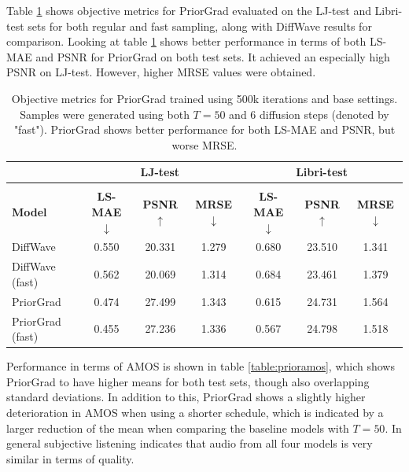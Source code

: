 \documentclass{report}
\begin{document}
Table \ref{table:priorstats} shows objective metrics for PriorGrad evaluated on the LJ-test and Libri-test sets for both regular and fast sampling, along with DiffWave results for comparison. Looking at table \ref{table:priorstats} shows better performance in terms of both LS-MAE and PSNR for PriorGrad on both test sets. It achieved an especially high PSNR on LJ-test. However, higher MRSE values were obtained. 

\begin{table}[H]
\centering
\def\arraystretch{1.3}
\begin{tabular}{l | c c c | c c c }
\hline
 & \multicolumn{3}{c|}{\textbf{LJ-test}} & \multicolumn{3}{c}{\textbf{Libri-test}} \\
\hline\hline
\vspace{-0.5cm} \\
\textbf{Model} & \textbf{LS-MAE} $\downarrow$ & \textbf{PSNR} $\uparrow$ & \textbf{MRSE} $\downarrow$ & \textbf{LS-MAE} $\downarrow$ & \textbf{PSNR} $\uparrow$ & \textbf{MRSE} $\downarrow$ \\ [0.5ex]
\hline
DiffWave & 0.550 & 20.331 & 1.279 & 0.680 & 23.510 & 1.341  \\
\hline
DiffWave (fast) & 0.562 & 20.069 & 1.314 & 0.684 & 23.461 & 1.379 \\
\hline
PriorGrad & 0.474 & 27.499 & 1.343 & 0.615 & 24.731 & 1.564 \\
\hline
PriorGrad (fast) & 0.455 & 27.236 & 1.336 & 0.567 & 24.798 & 1.518 \\
\hline\hline
\end{tabular}
\caption{\onehalfspacing Objective metrics for PriorGrad trained using 500k iterations and base settings. Samples were generated using both $T=50$ and $6$ diffusion steps (denoted by "fast"). PriorGrad shows better performance for both LS-MAE and PSNR, but worse MRSE.}
\label{table:priorstats}
\end{table}

Performance in terms of AMOS is shown in table \ref{table:prioramos}, which shows PriorGrad to have higher means for both test sets, though also overlapping standard deviations. In addition to this, PriorGrad shows a slightly higher deterioration in AMOS when using a shorter schedule, which is indicated by a larger reduction of the mean when comparing the baseline models with $T=50$. In general subjective listening indicates that audio from all four models is very similar in terms of quality.
\end{document}
